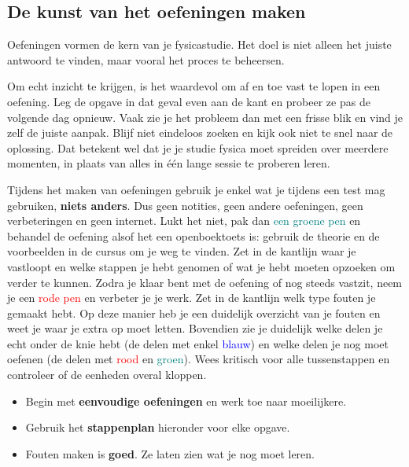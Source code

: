 \documentclass{ximera}
\begin{document}

\subsection{De kunst van het oefeningen maken}

Oefeningen vormen de kern van je fysicastudie.
Het doel is niet alleen het juiste antwoord te vinden, maar vooral het proces te beheersen.


Om echt inzicht te krijgen, is het waardevol om af en toe vast te lopen in een oefening.
Leg de opgave in dat geval even aan de kant en probeer ze pas de volgende dag opnieuw.
Vaak zie je het probleem dan met een frisse blik en vind je zelf de juiste aanpak.
Blijf niet eindeloos zoeken en kijk ook niet te snel naar de oplossing.
Dat betekent wel dat je je studie fysica moet spreiden over meerdere momenten,
in plaats van alles in één lange sessie te proberen leren.


Tijdens het maken van oefeningen gebruik je enkel wat je tijdens een test mag gebruiken, \textbf{niets anders}.
Dus geen notities, geen andere oefeningen, geen verbeteringen en geen internet.
\newline
Lukt het niet, pak dan \textcolor{teal}{een groene pen} en behandel de oefening alsof het een openboektoets is: gebruik de theorie en de voorbeelden in de cursus om je weg te vinden.
Zet in de kantlijn waar je vastloopt en welke stappen je hebt genomen of wat je hebt moeten opzoeken om verder te kunnen.
\newline
Zodra je klaar bent met de oefening of nog steeds vastzit, neem je een \textcolor{red}{rode pen} en verbeter je je werk. Zet in de kantlijn welk type fouten je gemaakt hebt.
Op deze manier heb je een duidelijk overzicht van je fouten en weet je waar je extra op moet letten.
Bovendien zie je duidelijk welke delen je echt onder de knie hebt (de delen met enkel \textcolor{blue}{blauw}) en welke delen je nog moet oefenen (de delen met \textcolor{red}{rood} en \textcolor{teal}{groen}).
Wees kritisch voor alle tussenstappen en controleer of de eenheden overal kloppen.



\begin{itemize}
    \item Begin met \textbf{eenvoudige oefeningen} en werk toe naar moeilijkere.
    \item Gebruik het \textbf{stappenplan} hieronder voor elke opgave.
    \item Fouten maken is \textbf{goed}. Ze laten zien wat je nog moet leren.
\end{itemize}
\end{document}
